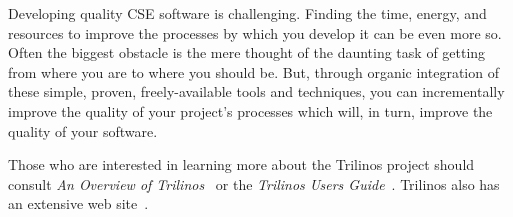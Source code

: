 \documentclass[12pt,relax]{article}
\begin{document}
Developing quality CSE software is challenging.  Finding the time, energy, and
resources to improve the processes by which you develop it can be even more so.
Often the biggest obstacle is the mere thought of the daunting task of getting
from where you are to where you should be.  But, through organic integration of
these simple, proven, freely-available tools and techniques, you can
incrementally improve the quality of your project's processes which will, in
turn, improve the quality of your software.

\clearpage


Those who are interested in learning more about the Trilinos project should
consult {\it An Overview of Trilinos}~\cite{Trilinos-Overview} or the
{\it Trilinos Users Guide}~\cite{Trilinos-Users-Guide}.  Trilinos also has an
extensive web site~\cite{Trilinos-home-page}.

\clearpage



%

\end{document}
